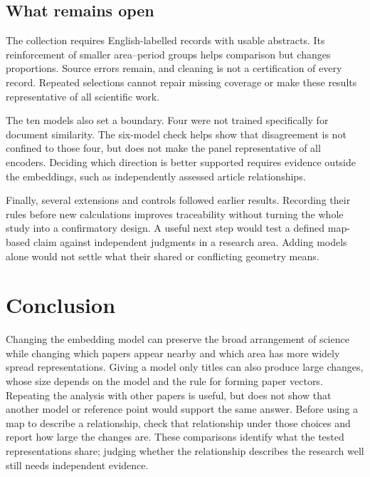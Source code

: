 \documentclass[12pt]{article}
\begin{document}
\subsection{What remains open}
The collection requires English-labelled records with usable abstracts. Its reinforcement of smaller area--period groups helps comparison but changes proportions. Source errors remain, and cleaning is not a certification of every record. Repeated selections cannot repair missing coverage or make these results representative of all scientific work.

The ten models also set a boundary. Four were not trained specifically for document similarity. The six-model check helps show that disagreement is not confined to those four, but does not make the panel representative of all encoders. Deciding which direction is better supported requires evidence outside the embeddings, such as independently assessed article relationships.

Finally, several extensions and controls followed earlier results. Recording their rules before new calculations improves traceability without turning the whole study into a confirmatory design. A useful next step would test a defined map-based claim against independent judgments in a research area. Adding models alone would not settle what their shared or conflicting geometry means.

\section{Conclusion}
Changing the embedding model can preserve the broad arrangement of science while changing which papers appear nearby and which area has more widely spread representations. Giving a model only titles can also produce large changes, whose size depends on the model and the rule for forming paper vectors. Repeating the analysis with other papers is useful, but does not show that another model or reference point would support the same answer. Before using a map to describe a relationship, check that relationship under those choices and report how large the changes are. These comparisons identify what the tested representations share; judging whether the relationship describes the research well still needs independent evidence.
\end{document}
